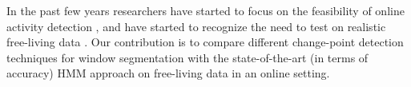 In the past few years researchers have started to focus on the feasibility of
online activity detection \cite{keogh01} \cite{wu09}, and have started to
recognize the need to test on realistic free-living data \cite{gu09} \cite{kwapitz10}
\cite{strohrmann11}. Our contribution is to compare different change-point detection
techniques for window segmentation with the state-of-the-art (in terms of
accuracy) HMM approach on free-living data in an online setting.
